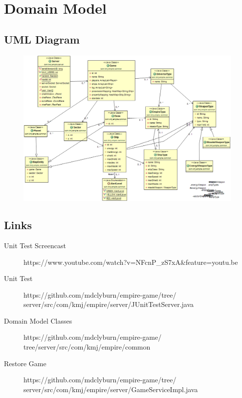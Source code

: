 \chapter{Domain Model}

\section{UML Diagram}

\begin{figure}[h]
\centering
	\includegraphics[width=6.5in]{image/domain_model_img}
\end{figure}

\section{Links}
\begin{description}
	\item[Unit Test Screencast] https://www.youtube.com/watch?v=NFcnP\_zS7xA\&feature=youtu.be
	\item[Unit Test] https://github.com/mdclyburn/empire-game/tree/\\server/src/com/kmj/empire/server/JUnitTestServer.java
	\item[Domain Model Classes] https://github.com/mdclyburn/empire-game/\\tree/server/src/com/kmj/empire/common
	\item[Restore Game] https://github.com/mdclyburn/empire-game/tree/\\server/src/com/kmj/empire/server/GameServiceImpl.java
\end{description}

